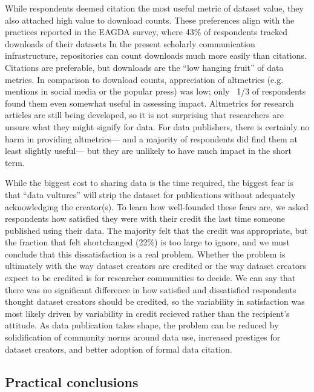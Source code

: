 \documentclass[10pt]{article}
\begin{document}
While respondents deemed citation the most useful metric of dataset value, they also attached high value to download counts.
These preferences align with the practices reported in the EAGDA survey, where 43\% of respondents tracked downloads of their datasets\cite{bobrow_establishing_2014}
In the present scholarly communication infrastructure, repositories can count downloads much more easily than citations.
Citations are preferable, but downloads are the ``low hanging fruit'' of data metrics.
In comparison to download counts, appreciation of altmetrics (e.g. mentions in social media or the popular press) was low; only ~1/3 of respondents found them even somewhat useful in assessing impact.
Altmetrics for research articles are still being developed, so it is not surprising that researchers are unsure what they might signify for data.
For data publishers, there is certainly no harm in providing altmetrics--- and a majority of respondents did find them at least slightly useful--- but they are unlikely to have much impact in the short term.

While the biggest cost to sharing data is the time required, the biggest fear is that ``data vultures'' will strip the dataset for publications without adequately acknowledging the creator(s)\cite{kim_institutional_2012}.
To learn how well-founded these fears are, we asked respondents how satisfied they were with their credit the last time someone published using their data.
The majority felt that the credit was appropriate, but the fraction that felt shortchanged (22\%) is too large to ignore, and we must conclude that this dissatisfaction is a real problem.
Whether the problem is ultimately with the way dataset creators are credited or the way dataset creators expect to be credited is for researcher communities to decide.
We can say that there was no significant difference in how satisfied and dissatisfied respondents thought dataset creators should be credited, so the variability in satisfaction was most likely driven by variability in credit recieved rather than the recipient's attitude.
As data publication takes shape, the problem can be reduced by solidification of community norms around data use, increased prestiges for dataset creators, and better adoption of formal data citation.

\subsection*{Practical conclusions}
\end{document}
